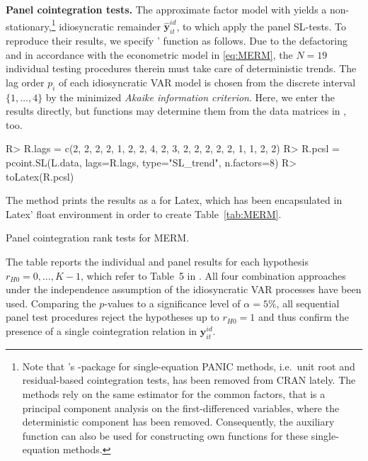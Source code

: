 \textbf{Panel cointegration tests.} The approximate factor model with  yields a non-stationary,\footnote{Note that \citeauthor{Bronder2016}'s \citeyearpar{Bronder2016} -package  for single-equation PANIC methods, i.e.~unit root and residual-based cointegration tests, has been removed from CRAN lately. The methods rely on the same estimator for the common factors, that is a principal component analysis on the first-differenced variables, where the deterministic component has been removed. Consequently, the auxiliary function  can also be used for constructing own functions for these single-equation methods.} idiosyncratic remainder $ \boldsymbol{\hat{y}}^{i \! d}_{it} $, to which \citet{ArsovaOersal2017} apply the panel SL-tests. To reproduce their results, we specify ' function  as follows. Due to the defactoring and in accordance with the econometric model in \eqref{eq:MERM}, the $ N=19 $ individual testing procedures therein must take care of deterministic trends. The lag order $ p_i $ of each idiosyncratic VAR model is chosen from the discrete interval $ \lbrace 1,\ldots,4 \rbrace $ by the minimized \textit{Akaike information criterion}. Here, we enter the results directly, but  functions may determine them from the data matrices in , too.
\begin{CodeChunk}
\begin{CodeInput}
R> R.lags = c(2, 2, 2, 2, 1, 2, 2, 4, 2, 3, 2, 2, 2, 2, 2, 1, 1, 2, 2)
R> R.pcsl = pcoint.SL(L.data, lags=R.lags, type="SL_trend", n.factors=8)
R> toLatex(R.pcsl)
\end{CodeInput}
\end{CodeChunk}
The method  prints the  results as a  for Latex, which has been encapsulated in Latex' float environment in order to create Table~\ref{tab:MERM}. 
\begin{table}[ht]	%
	\centering
	\caption[Cointegration rank tests]{Panel cointegration rank tests for MERM.} 
	\resizebox{0.8\textwidth}{!}{
		}	
	\label{tab:MERM}
\end{table}
The table reports the individual and panel results for each hypothesis $ r_{H0} = 0, \ldots, K-1 $, which refer to Table~5 in \citet[p.~68]{ArsovaOersal2017}. All four combination approaches under the independence assumption of the idiosyncratic VAR processes have been used. Comparing the $p$-values to a significance level of $ \alpha = 5 \% $, all sequential panel test procedures reject the hypotheses up to $ r_{H0} = 1 $ and thus confirm the presence of a single cointegration relation in $ \boldsymbol{{y}}^{i \! d}_{it} $.


